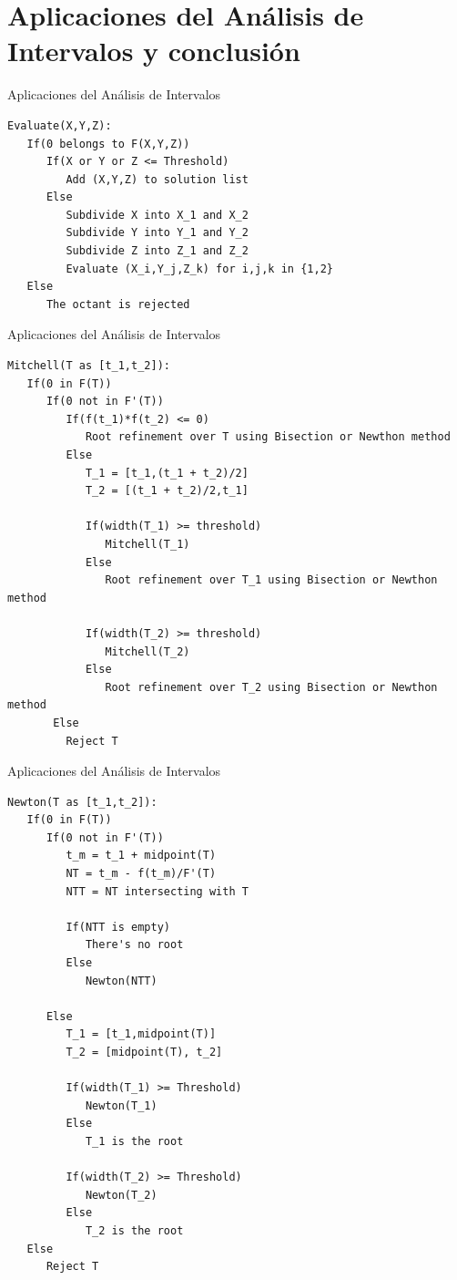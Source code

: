 \documentclass{beamer}
\begin{document}
\section{Aplicaciones del Análisis de Intervalos y conclusión}
\begin{frame}[fragile]{Aplicaciones del Análisis de Intervalos}
\begin{verbatim}
Evaluate(X,Y,Z):
   If(0 belongs to F(X,Y,Z))
      If(X or Y or Z <= Threshold)
         Add (X,Y,Z) to solution list
      Else
         Subdivide X into X_1 and X_2
         Subdivide Y into Y_1 and Y_2
         Subdivide Z into Z_1 and Z_2
         Evaluate (X_i,Y_j,Z_k) for i,j,k in {1,2}
   Else
      The octant is rejected
\end{verbatim}
\end{frame}

\begin{frame}[fragile]{Aplicaciones del Análisis de Intervalos}
\scriptsize
\begin{verbatim}
Mitchell(T as [t_1,t_2]):
   If(0 in F(T))
      If(0 not in F'(T))
         If(f(t_1)*f(t_2) <= 0)
            Root refinement over T using Bisection or Newthon method
         Else
            T_1 = [t_1,(t_1 + t_2)/2]
            T_2 = [(t_1 + t_2)/2,t_1]
          
            If(width(T_1) >= threshold)
               Mitchell(T_1)
            Else
               Root refinement over T_1 using Bisection or Newthon method
         
            If(width(T_2) >= threshold)
               Mitchell(T_2)
            Else
               Root refinement over T_2 using Bisection or Newthon method
       Else
         Reject T
\end{verbatim}
\end{frame}

\begin{frame}[fragile]{Aplicaciones del Análisis de Intervalos}
\tiny
\begin{verbatim}
Newton(T as [t_1,t_2]):
   If(0 in F(T))
      If(0 not in F'(T))
         t_m = t_1 + midpoint(T)
         NT = t_m - f(t_m)/F'(T)
         NTT = NT intersecting with T
        
         If(NTT is empty)
            There's no root
         Else
            Newton(NTT)
        
      Else
         T_1 = [t_1,midpoint(T)]
         T_2 = [midpoint(T), t_2]
         
         If(width(T_1) >= Threshold)
            Newton(T_1)
         Else
            T_1 is the root
            
         If(width(T_2) >= Threshold)
            Newton(T_2)
         Else
            T_2 is the root
   Else
      Reject T
\end{verbatim}
\end{frame}
\end{document}

